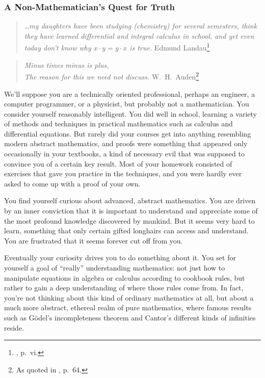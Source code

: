 \subsubsection{A Non-Mathematician's Quest for Truth}

\begin{quote}
  {\em \ldots my daughters have been studying (chemistry) for several
se\-mes\-ters, think they have learned differential and integral calculus in
school, and yet even today don't know why $x\cdot y=y\cdot x$ is true.}
  \flushright\sc  Edmund Landau\footnote{\cite{Landau}, p.~vi.}\\
\end{quote}

\begin{quote}
  {\em Minus times minus is plus,\\
The reason for this we need not discuss.}
  \flushright\sc W.\ H.\ Auden\footnote{As quoted in \cite{Guillen}, p.~64.}\\
\end{quote}

We'll suppose you are a technically oriented professional, perhaps an engineer, a
computer programmer, or a physicist, but probably not a mathematician.  You
consider yourself reasonably intelligent.  You did well in school, learning a
variety of methods and techniques in practical mathematics such as calculus and
differential equations.  But rarely did your courses get into anything
resembling modern abstract mathematics, and proofs were something that appeared
only occasionally in your textbooks, a kind of necessary evil that was
supposed to convince you of a certain key result.  Most of your
homework consisted of exercises that gave you practice in the techniques, and
you were hardly ever asked to come up with a proof of your own.

You find yourself curious about advanced, abstract mathematics.  You are
driven by an inner conviction that it is important to understand and
appreciate some of the most profound knowledge discovered by mankind.  But it
seems very hard to learn, something that only certain gifted longhairs can
access and understand.  You are frustrated that it seems forever cut off from
you.

Eventually your curiosity drives you to do something about it.
You set for yourself a goal of ``really'' understanding mathematics:  not just
how to manipulate equations in algebra or calculus according to cookbook
rules, but rather to gain a deep understanding of where those rules come from.
In fact, you're not thinking about this kind of ordinary mathematics at all,
but about a much more abstract, ethereal realm of pure mathematics, where
famous results such as G\"{o}del's incompleteness theorem and Cantor's different kinds of infinities
reside.

